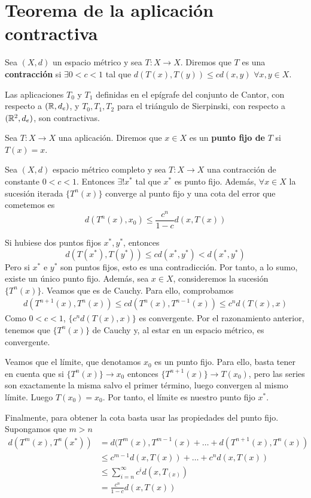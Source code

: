 \documentclass[FyPI.tex]{subfiles}
\begin{document}
\section{Teorema de la aplicación contractiva}
\begin{defi}
Sea $(X,d)$ un espacio métrico y sea $T:X\to X$. Diremos que $T$ es una \textbf{contracción} si $\exists 0<c<1$ tal que $d(T(x),T(y))\leq c d(x,y)$ $\forall x,y \in X$.
\end{defi}
\begin{example}
Las aplicaciones $T_0$ y $T_1$ definidas en el epígrafe del conjunto de Cantor, con respecto a $(\mathbb{R},d_e)$, y $T_0,T_1,T_2$ para el triángulo de Sierpinski, con respecto a $(\mathbb{R}^2,d_e)$, son contractivas.
\end{example}
\begin{defi}
Sea $T:X\to X$ una aplicación. Diremos que $x \in X$ es un \textbf{punto fijo de} $T$ si $T(x)=x$. 
\end{defi}
\begin{theorem}[Banach (1922)] Sea $(X,d)$ espacio métrico completo y sea $T:X\to X$ una contracción de constante $0<c<1$. Entonces $\exists! x^*$ tal que $x^*$ es punto fijo. Además, $\forall x\in X$ la sucesión iterada $\{T^n(x)\}$ converge al punto fijo y una cota del error que cometemos es
$$
d(T^n(x),x_0) \leq \frac{c^n}{1-c}d(x,T(x))
$$
\end{theorem}
\begin{dem}
Si hubiese dos puntos fijos $x^*,y^*$, entonces
$$
d(T(x^*),T(y^*)) \leq c d(x^*,y^*) < d(x^*,y^*)
$$
Pero si $x^*$ e $y^*$ son puntos fijos, esto es una contradicción. Por tanto, a lo sumo, existe un único punto fijo. Además, sea $x\in X$, consideremos la sucesión $\{T^n(x)\}$. Veamos que es de Cauchy. Para ello, comprobamos
\begin{align*}
d(T^{n+1}(x),T^n(x)) \leq c d(T^n(x),T^{n-1}(x)) \leq c^n d(T(x),x)
\end{align*}
Como $0<c <1$, $\{c^n d(T(x),x)\}$ es convergente. Por el razonamiento anterior, tenemos que $\{T^n(x)\}$ de Cauchy y, al estar en un espacio métrico, es convergente. 

Veamos que el límite, que denotamos $x_0$ es un punto fijo. Para ello, basta tener en cuenta que si $\{T^n(x)\}\to x_0$ entonces $\{T^{n+1}(x)\}\to T(x_0)$, pero las series son exactamente la misma salvo el primer término, luego convergen al mismo límite. Luego $T(x_0)=x_0$. Por tanto, el límite es nuestro punto fijo $x^*$.

Finalmente, para obtener la cota basta usar las propiedades del punto fijo. Supongamos que $m>n$
\begin{align*}
d(T^m(x),T^n(x^*)) & = d(T^m(x),T^{m-1}(x) + \dotsc + d(T^{n+1}(x),T^n(x))\\
& \leq c^{m-1}d(x,T(x)) + \dotsc + c^n d(x,T(x)) \\
& \leq \sum_{i=n}^\infty c^i d(x,T_(x))\\
&= \frac{c^n}{1-c}d(x,T(x))
\end{align*}
\end{dem}
\end{document}
